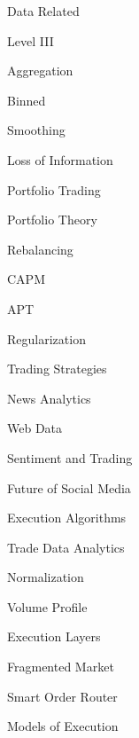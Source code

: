%
\begin{minipage}{0.35\textwidth}
Data Related
	\begin{flushright}
	Level III \par
	Aggregation \par
	Binned \par
	Smoothing \par
	Loss of Information
	\end{flushright}

Portfolio Trading
	\begin{flushright}
	Portfolio Theory \par
	Rebalancing \par
	CAPM \par
	APT \par
	Regularization \par
	Trading Strategies
	\end{flushright}
	
News Analytics
	\begin{flushright}
	Web Data \par
	Sentiment and Trading \par
	Future of Social Media
	\end{flushright}
	
Execution Algorithms
	\begin{flushright}
	Trade Data Analytics \par
	Normalization \par
	Volume Profile \par
	Execution Layers \par
	Fragmented Market \par
	Smart Order Router \par
	Models of Execution
	\end{flushright}
\end{minipage}